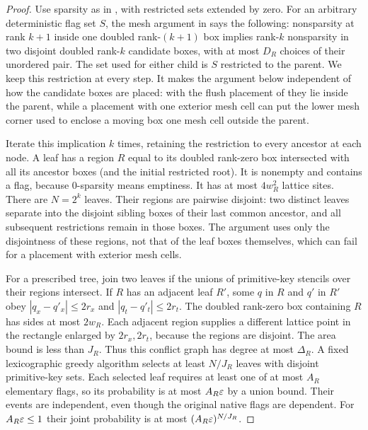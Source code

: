 \begin{proof}
Use sparsity as in \cite[Definition~\ref*{cl:def:sparse}]{DMNoise1D2026}, with restricted sets extended by zero. For an arbitrary deterministic flag set \(S\), the mesh argument in \cite[Lemma~\ref*{cl:lem:sparse-witness}]{DMNoise1D2026} says the following: nonsparsity at rank \(k+1\) inside one doubled rank-\((k+1)\) box implies rank-\(k\) nonsparsity in two disjoint doubled rank-\(k\) candidate boxes, with at most \(D_{R}\) choices of their unordered pair. The set used for either child is \(S\) restricted to the parent. We keep this restriction at every step. It makes the argument below independent of how the candidate boxes are placed: with the flush placement of \cite[Lemma~\ref*{cl:lem:sparse-witness}]{DMNoise1D2026} they lie inside the parent, while a placement with one exterior mesh cell can put the lower mesh corner used to enclose a moving box one mesh cell outside the parent.

Iterate this implication \(k\) times, retaining the restriction to every ancestor at each node. A leaf has a region \(R\) equal to its doubled rank-zero box intersected with all its ancestor boxes (and the initial restricted root). It is nonempty and contains a flag, because 0-sparsity means emptiness. It has at most \(4w_{R}^{2}\) lattice sites. There are \(N=2^{k}\) leaves. Their regions are pairwise disjoint: two distinct leaves separate into the disjoint sibling boxes of their last common ancestor, and all subsequent restrictions remain in those boxes. The argument uses only the disjointness of these regions, not that of the leaf boxes themselves, which can fail for a placement with exterior mesh cells.

For a prescribed tree, join two leaves if the unions of primitive-key stencils over their regions intersect. If \(R\) has an adjacent leaf \(R'\), some \(q\) in \(R\) and \(q'\) in \(R'\) obey \(|q_{x}-q'_{x}| \le  2r_{x}\) and \(|q_{t}-q'_{t}| \le  2r_{t}\). The doubled rank-zero box containing \(R\) has sides at most \(2w_{R}\). Each adjacent region supplies a different lattice point in the rectangle enlarged by \(2r_{x},2r_{t}\), because the regions are disjoint. The area bound is less than \(J_{R}\). Thus this conflict graph has degree at most \(\Delta_{R}\). A fixed lexicographic greedy algorithm selects at least \(N/J_{R}\) leaves with disjoint primitive-key sets. Each selected leaf requires at least one of at most \(A_{R}\) elementary flags, so its probability is at most \(A_{R} \varepsilon\) by a union bound. Their events are independent, even though the original native flags are dependent. For \(A_{R} \varepsilon \le  1\) their joint probability is at most \((A_{R} \varepsilon)^{N/J_{R}}\).


\end{proof}
